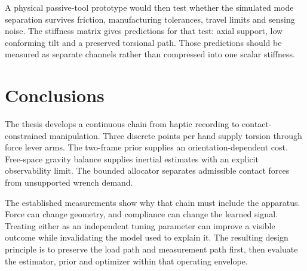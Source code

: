 A physical passive-tool prototype would then test whether the simulated mode separation survives friction, manufacturing tolerances, travel limits and sensing noise. The stiffness matrix gives predictions for that test: axial support, low conforming tilt and a preserved torsional path. Those predictions should be measured as separate channels rather than compressed into one scalar stiffness.

\section{Conclusions}

The thesis develops a continuous chain from haptic recording to contact-constrained manipulation. Three discrete points per hand supply torsion through force lever arms. The two-frame prior supplies an orientation-dependent cost. Free-space gravity balance supplies inertial estimates with an explicit observability limit. The bounded allocator separates admissible contact forces from unsupported wrench demand.

The established measurements show why that chain must include the apparatus. Force can change geometry, and compliance can change the learned signal. Treating either as an independent tuning parameter can improve a visible outcome while invalidating the model used to explain it. The resulting design principle is to preserve the load path and measurement path first, then evaluate the estimator, prior and optimizer within that operating envelope.

